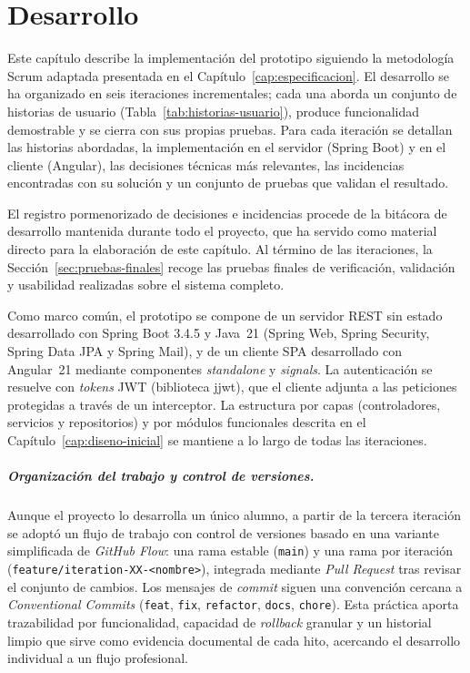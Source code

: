 \chapter{Desarrollo}
\label{cap:desarrollo}

Este capítulo describe la implementación del prototipo siguiendo la metodología Scrum adaptada presentada en el Capítulo~\ref{cap:especificacion}. El desarrollo se ha organizado en seis iteraciones incrementales; cada una aborda un conjunto de historias de usuario (Tabla~\ref{tab:historias-usuario}), produce funcionalidad demostrable y se cierra con sus propias pruebas. Para cada iteración se detallan las historias abordadas, la implementación en el servidor (Spring Boot) y en el cliente (Angular), las decisiones técnicas más relevantes, las incidencias encontradas con su solución y un conjunto de pruebas que validan el resultado.

El registro pormenorizado de decisiones e incidencias procede de la bitácora de desarrollo mantenida durante todo el proyecto, que ha servido como material directo para la elaboración de este capítulo. Al término de las iteraciones, la Sección~\ref{sec:pruebas-finales} recoge las pruebas finales de verificación, validación y usabilidad realizadas sobre el sistema completo.

Como marco común, el prototipo se compone de un servidor REST sin estado desarrollado con Spring Boot 3.4.5 y Java~21 (Spring Web, Spring Security, Spring Data JPA y Spring Mail), y de un cliente SPA desarrollado con Angular~21 mediante componentes \textit{standalone} y \textit{signals}. La autenticación se resuelve con \textit{tokens} JWT (biblioteca jjwt), que el cliente adjunta a las peticiones protegidas a través de un interceptor. La estructura por capas (controladores, servicios y repositorios) y por módulos funcionales descrita en el Capítulo~\ref{cap:diseno-inicial} se mantiene a lo largo de todas las iteraciones.

\paragraph{Organización del trabajo y control de versiones.}
Aunque el proyecto lo desarrolla un único alumno, a partir de la tercera iteración se adoptó un flujo de trabajo con control de versiones basado en una variante simplificada de \textit{GitHub Flow}: una rama estable (\texttt{main}) y una rama por iteración (\texttt{feature/iteration-XX-<nombre>}), integrada mediante \textit{Pull Request} tras revisar el conjunto de cambios. Los mensajes de \textit{commit} siguen una convención cercana a \textit{Conventional Commits} (\texttt{feat}, \texttt{fix}, \texttt{refactor}, \texttt{docs}, \texttt{chore}). Esta práctica aporta trazabilidad por funcionalidad, capacidad de \textit{rollback} granular y un historial limpio que sirve como evidencia documental de cada hito, acercando el desarrollo individual a un flujo profesional.


